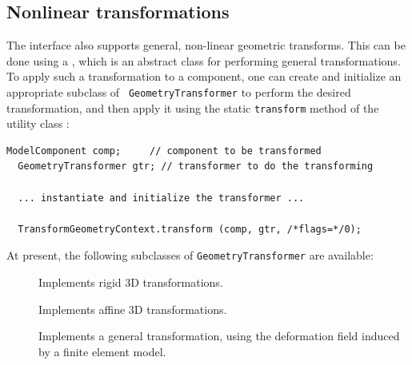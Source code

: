 \subsection{Nonlinear transformations}

The 
interface also supports general, non-linear geometric transforms.
This can be done using a
, which is an
abstract class for performing general transformations.  To apply such
a transformation to a component, one can create and initialize an appropriate
subclass of {\tt
GeometryTransformer} to perform the desired transformation, and
then apply it using the static {\tt transform} method of the utility class 
:
%
\begin{lstlisting}[]
  ModelComponent comp;     // component to be transformed
  GeometryTransformer gtr; // transformer to do the transforming

  ... instantiate and initialize the transformer ...

  TransformGeometryContext.transform (comp, gtr, /*flags=*/0);
\end{lstlisting}
%

At present, the following subclasses of {\tt GeometryTransformer} are
available:

\begin{description}

\item[]\mbox{}

Implements rigid 3D transformations.

\item[]\mbox{}

Implements affine 3D transformations.

\item[]\mbox{}

Implements a general transformation, using the deformation field
induced by a finite element model. 

\end{description}

